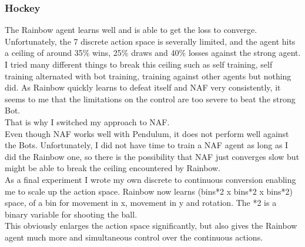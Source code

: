 \subsubsection{Hockey}
The Rainbow agent learns well and is able to get the loss to converge. Unfortunately, the 7 discrete action space is severally limited, and the agent hits a ceiling of around 35\% wins, 25\% draws and 40\% losses against the strong agent.\\
I tried many different things to break this ceiling such as self training, self training alternated with bot training, training against other agents but nothing did.
As Rainbow quickly learns to defeat itself and NAF very consistently, it seems to me that the limitations on the control are too severe to beat the strong Bot.\\
That is why I switched my approach to NAF.\\
Even though NAF works well with Pendulum, it does not perform well against the Bots.
Unfortunately, I did not have time to train a NAF agent as long as I did the Rainbow one, so there is the possibility that NAF just converges slow but might be able to break the ceiling encountered by Rainbow.\\
As a final experiment I wrote my own discrete to continuous conversion enabling me to scale up the action space.
Rainbow now learns (bins*2 x bins*2 x bins*2) space, of a bin for movement in x, movement in y and rotation. The *2 is a binary variable for shooting the ball.\\
This obviously enlarges the action space significantly, but also gives the Rainbow agent much more and simultaneous control over the continuous actions.